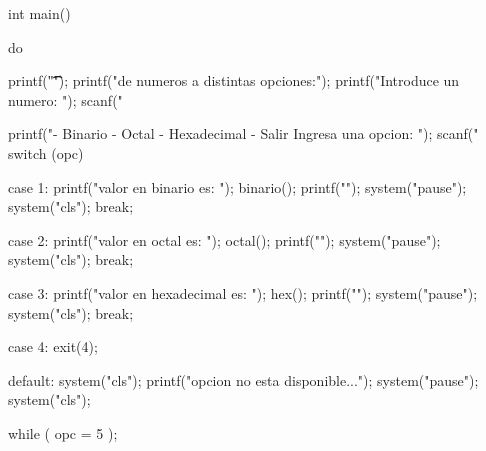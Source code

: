 \documentclass[conference]{IEEEtran}
\begin{document}
int main() { 
	do{	
	   printf("\t\t < PRACTICA 1 >\n");
	   printf("\nConvertidor de numeros a distintas opciones:");
	   printf("\n Introduce un numero: "); 
	   scanf("%
   
	   printf("- Binario - Octal - Hexadecimal - Salir \n Ingresa una opcion: ");
	   scanf("%
	   switch (opc)
	   {
	    case 1:
	    	printf("\nEl valor en binario es: \n");
			binario(); 
			printf("\n\n");
			system("pause");
			system("cls");
			break;
	 
	 	case 2: 
	 		printf("\nEl valor en octal es: \n");
			octal();
			printf("\n\n");
			system("pause");
			system("cls");
			break;
	 
		case 3: 
			printf("\nEl valor en hexadecimal es: \n");
			hex();
			printf("\n\n");
			system("pause");
			system("cls");
			break;
	 
	 	case 4:
	 		exit(4);
	 
		default:
			system("cls");
			printf("\n\n\tEsa opcion no esta disponible...\n");   
			system("pause");
			system("cls");
		}  
	} while ( opc = 5 );	   
}
\end{document}
